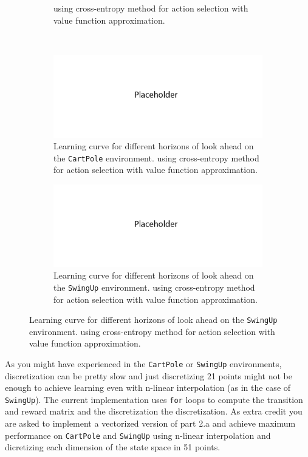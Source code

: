 \documentclass{article}
\begin{document}
\begin{enumerate}[(a)]
\begin{figure}[h!]
\begin{subfigure}{0.45\textwidth}
{                using cross-entropy method for action selection with value function approximation.}
    \end{subfigure}
\\
    \centering
    \begin{subfigure}{0.45\textwidth}
        \centering
        \includegraphics[width=\textwidth]{figures/placeholder_2.png}
          \caption{Learning curve for different horizons of look ahead on the \texttt{CartPole} environment. 
                 using cross-entropy method for action selection with value function approximation.}
    \end{subfigure}
    \hspace{0.2in}
    \begin{subfigure}{0.45\textwidth}
        \centering
        \includegraphics[width=\textwidth]{figures/placeholder_2.png}
          \caption{Learning curve for different horizons of look ahead on the \texttt{SwingUp} environment. 
                 using cross-entropy method for action selection with value function approximation.}
    \end{subfigure}
\end{figure}


\end{enumerate}

\newpage
{}

As you might have experienced in the \texttt{CartPole} or \texttt{SwingUp} environments, discretization can be pretty slow and just discretizing 21 points might not be enough to achieve learning even with n-linear interpolation (as in the case of \texttt{SwingUp}). The current implementation uses \texttt{for} loops to compute the transition and reward matrix and the discretization the discretization. As extra credit you are asked to implement a vectorized version of part 2.a and achieve maximum performance on \texttt{CartPole} and \texttt{SwingUp} using n-linear interpolation and dicretizing each dimension of the state space in 51 points.
\end{document}
